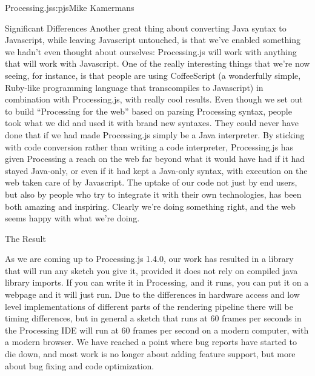 \begin{aosachapter}{Processing.js}{s:pjs}{Mike Kamermans}
\begin{aosasect1}{Significant Differences}
Another great thing about converting Java syntax to Javascript, while
leaving Javascript untouched, is that we've enabled something we
hadn't even thought about ourselves: Processing.js will work with
anything that will work with Javascript. One of the really interesting
things that we're now seeing, for instance, is that people are using
CoffeeScript (a wonderfully simple, Ruby-like programming language
that transcompiles to Javascript) in combination with Processing.js,
with really cool results. Even though we set out to build ``Processing
for the web'' based on parsing Processing syntax, people took what we
did and used it with brand new syntaxes. They could never have done
that if we had made Processing.js simply be a Java interpreter. By
sticking with code conversion rather than writing a code interpreter,
Processing.js has given Processing a reach on the web far beyond what
it would have had if it had stayed Java-only, or even if it had kept a
Java-only syntax, with execution on the web taken care of by
Javascript. The uptake of our code not just by end users, but also by
people who try to integrate it with their own technologies, has been
both amazing and inspiring. Clearly we're doing something right, and
the web seems happy with what we're doing.

\begin{aosasect2}{The Result}

As we are coming up to Processing.js 1.4.0, our work has resulted in a
library that will run any sketch you give it, provided it does not
rely on compiled java library imports. If you can write it in
Processing, and it runs, you can put it on a webpage and it will just
run. Due to the differences in hardware access and low level
implementations of different parts of the rendering pipeline there
will be timing differences, but in general a sketch that runs at 60
frames per seconds in the Processing IDE will run at 60 frames per
second on a modern computer, with a modern browser. We have reached a
point where bug reports have started to die down, and most work is no
longer about adding feature support, but more about bug fixing and
code optimization.


\end{aosasect2}
\end{aosasect1}
\end{aosachapter}
